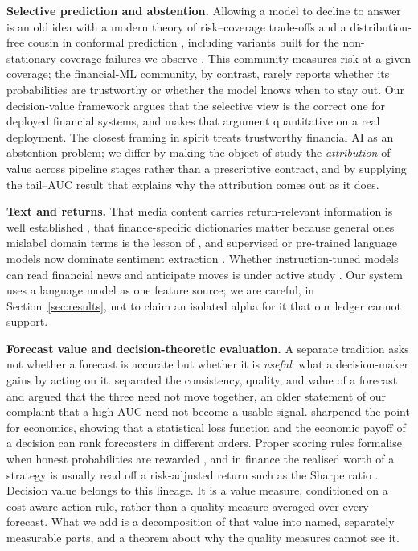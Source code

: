 \documentclass{sbc2023}%
\theoremstyle{definition}
\theoremstyle{plain}
\begin{document}
\noindent\textbf{Selective prediction and abstention.}
Allowing a model to decline to answer is an old idea \citep{chow1970} with a modern
theory of risk--coverage trade-offs \citep{elyaniv2010,geifman2017} and a distribution-free cousin in conformal prediction \citep{vovk2005,angelopoulos2021}, including variants built for the non-stationary
coverage failures we observe \citep{gibbs2021}. This community measures
risk at a given coverage; the financial-ML community, by contrast, rarely reports
whether its probabilities are trustworthy or whether the model knows when to stay
out. Our decision-value framework argues that the selective
view is the correct one for deployed financial systems, and makes that argument
quantitative on a real deployment. The closest framing in spirit treats trustworthy financial AI as an
abstention problem; we differ by making the object of study the \emph{attribution}
of value across pipeline stages rather than a prescriptive contract, and by
supplying the tail--AUC result that explains why the attribution comes out as it
does.

\noindent\textbf{Text and returns.}
That media content carries return-relevant information is well established
\citep{tetlock2007,antweiler2004}, that finance-specific dictionaries matter
because general ones mislabel domain terms is the lesson of \citep{loughran2011}, and supervised or pre-trained language models now dominate sentiment
extraction \citep{devlin2019,ke2019}. Whether instruction-tuned models
can read financial news and anticipate moves is under active study \citep{lopezlira2023}. Our system uses a language model as one feature source; we are careful,
in Section~\ref{sec:results}, not to claim an isolated alpha for it that our ledger
cannot support.

\noindent\textbf{Forecast value and decision-theoretic evaluation.}
A separate tradition asks not whether a forecast is accurate but whether it is
\emph{useful}: what a decision-maker gains by acting on it. \citet{murphy1993}
separated the consistency, quality, and value of a forecast and argued that the three
need not move together, an older statement of our complaint that a high AUC need not
become a usable signal. \citet{granger2000} sharpened the
point for economics, showing that a statistical loss function and the economic payoff
of a decision can rank forecasters in different orders. Proper scoring rules formalise
when honest probabilities are rewarded \citep{gneitingraftery2007}, and in finance the
realised worth of a strategy is usually read off a risk-adjusted return such as the
Sharpe ratio \citep{sharpe1994}. Decision value belongs to this lineage. It is a value
measure, conditioned on a cost-aware action rule, rather than a quality measure
averaged over every forecast. What we add is a decomposition of that value into named,
separately measurable parts, and a theorem about why the quality measures cannot see
it.
\end{document}
